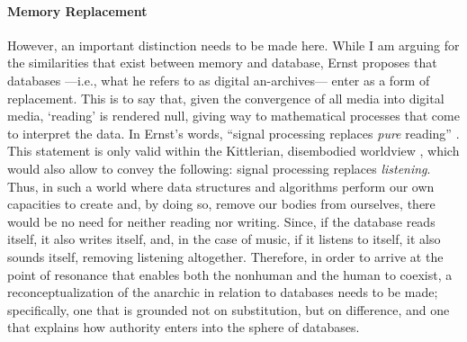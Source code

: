 \paragraph{Memory Replacement}
However, an important distinction needs to be made here. While I am arguing for the similarities that exist between memory and database, Ernst proposes that databases ---i.e., what he refers to as digital an-archives--- enter as a form of replacement. This is to say that, given the convergence of all media into digital media, `reading' is rendered null, giving way to mathematical processes that come to interpret the data. In Ernst's words, ``signal processing replaces \textit{pure} reading'' \im \parencite[130]{Ern13:Dig}. This statement is only valid within the Kittlerian, disembodied worldview , which would also allow to convey the following: signal processing replaces \textit{listening}. Thus, in such a world where data structures and algorithms perform our own capacities to create and, by doing so, remove our bodies from ourselves, there would be no need for neither reading nor writing. Since, if the database reads itself, it also writes itself, and, in the case of music, if it listens to itself, it also sounds itself, removing listening altogether. Therefore, in order to arrive at the point of resonance that enables both the nonhuman and the human to coexist, a reconceptualization of the anarchic in relation to databases needs to be made; specifically, one that is grounded not on substitution, but on difference, and one that explains how authority enters into the sphere of databases.

